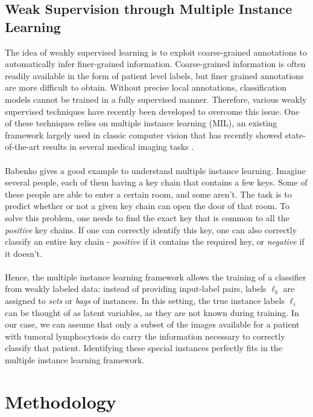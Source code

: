 \documentclass[final]{cvpr}
\begin{document}
	\subsection{Weak Supervision through Multiple Instance Learning} 
	
	The idea of weakly supervised learning is to exploit coarse-grained annotations to automatically infer finer-grained information. Coarse-grained information is often readily available in the form of patient level labels, but finer grained annotations are more difficult to obtain. Without precise local annotations, classification models cannot be trained in a fully supervised manner. Therefore, various weakly supervised techniques have recently been developed to overcome this issue. One of these techniques relies on multiple instance learning (MIL), an existing framework largely used in classic computer vision that has recently showed state-of-the-art results in several medical imaging tasks \cite{hou_MIL}. \\
	\\
	Babenko \cite{mil} gives a good example to understand multiple instance learning. Imagine several people, each of them having a key chain that contains a few keys. Some of these people are able to enter a certain room, and some aren’t. The task is to predict whether or not a given key chain can open the door of that room. To solve this problem, one needs to find the exact key that is common to all the \textit{positive} key chains. If one can correctly identify this key, one can also correctly classify an entire key chain - \textit{positive} if it contains the required key, or \textit{negative} if it doesn't.\\
	\\
	Hence, the multiple instance learning framework allows the training of a classifier from weakly labeled data: instead of providing input-label pairs, labels $\ell_b$ are assigned to \emph{sets} or \emph{bags} of instances. In this setting, the true instance labels $\ell_i$ can be thought of as latent variables, as they are not known during training. In our case, we can assume that only a subset of the images available for a patient with tumoral lymphocytosis do carry the information necessary to correctly classify that patient. Identifying these special instances perfectly fits in the multiple instance learning framework.

	\section{Methodology}
	\label{sec:method}
	
\end{document}
